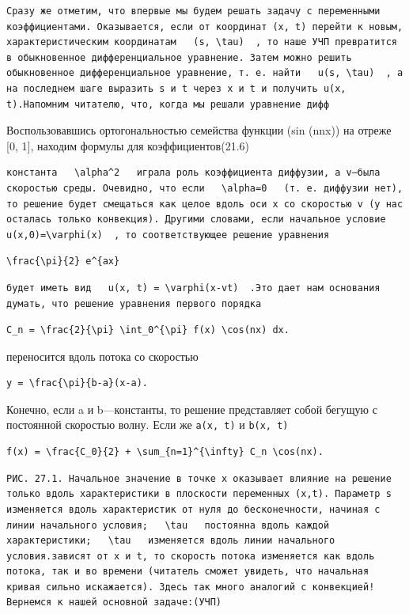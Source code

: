 \documentclass[
  ukrainian,
]{article}
\begin{document}
\begin{verbatim}
Сразу же отметим, что впервые мы будем решать задачу с переменными коэффициентами. Оказывается, если от координат (x, t) перейти к новым, характеристическим координатам   (s, \tau)  , то наше УЧП превратится в обыкновенное дифференциальное уравнение. Затем можно решить обыкновенное дифференциальное уравнение, т. е. найти   u(s, \tau)  , а на последнем шаге выразить s и t через x и t и получить u(x, t).Напомним читателю, что, когда мы решали уравнение дифф
\end{verbatim}

Воспользовавшись ортогональностью семейства функции (sin (nnx)) на
отреже {[}0, 1{]}, находим формулы для коэффициентов(21.6)

\begin{verbatim}
константа   \alpha^2   играла роль коэффициента диффузии, а v—была скоростью среды. Очевидно, что если   \alpha=0   (т. е. диффузии нет), то решение будет смещаться как целое вдоль оси x со скоростью v (у нас осталась только конвекция). Другими словами, если начальное условие   u(x,0)=\varphi(x)  , то соответствующее решение уравнения
\end{verbatim}

\begin{verbatim}
\frac{\pi}{2} e^{ax}
\end{verbatim}

\begin{verbatim}
будет иметь вид   u(x, t) = \varphi(x-vt)  .Это дает нам основания думать, что решение уравнения первого порядка
\end{verbatim}

\begin{verbatim}
C_n = \frac{2}{\pi} \int_0^{\pi} f(x) \cos(nx) dx.
\end{verbatim}

переносится вдоль потока со скоростью

\begin{verbatim}
y = \frac{\pi}{b-a}(x-a).
\end{verbatim}

Конечно, если a и b---константы, то решение представляет собой бегущую с
постоянной скоростью волну. Если же \texttt{a(x,\ t)} и
\texttt{b(x,\ t)}

\begin{verbatim}
f(x) = \frac{C_0}{2} + \sum_{n=1}^{\infty} C_n \cos(nx).
\end{verbatim}

\begin{verbatim}
РИС. 27.1. Начальное значение в точке x оказывает влияние на решение только вдоль характеристики в плоскости переменных (x,t). Параметр s изменяется вдоль характеристик от нуля до бесконечности, начиная с линии начального условия;   \tau   постоянна вдоль каждой характеристики;   \tau   изменяется вдоль линии начального условия.зависят от x и t, то скорость потока изменяется как вдоль потока, так и во времени (читатель сможет увидеть, что начальная кривая сильно искажается). Здесь так много аналогий с конвекцией!Вернемся к нашей основной задаче:(УЧП)
\end{verbatim}
\end{document}
